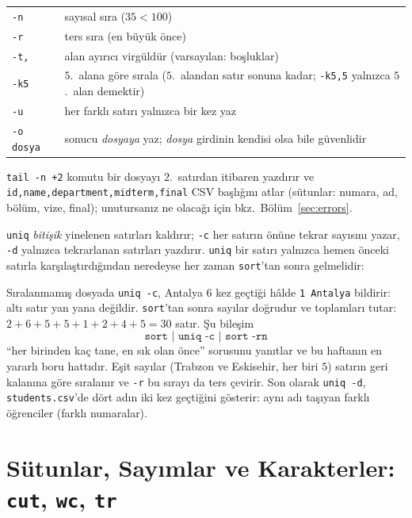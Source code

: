 \documentclass[11pt,a4paper]{article}
\newcommand{\cmd}[1]{\texttt{#1}}
\begin{document}
\begin{center}
\renewcommand{\arraystretch}{1.2}
\begin{tabular}{@{}lp{11.5cm}@{}}
\toprule
\cmd{-n} & sayısal sıra ($35 < 100$)\\
\cmd{-r} & ters sıra (en büyük önce)\\
\cmd{-t,} & alan ayırıcı virgüldür (varsayılan: boşluklar)\\
\cmd{-k5} & $5$.~alana göre sırala ($5$.~alandan satır sonuna kadar; \cmd{-k5,5} yalnızca $5$.~alan demektir)\\
\cmd{-u} & her farklı satırı yalnızca bir kez yaz\\
\cmd{-o dosya} & sonucu \emph{dosyaya} yaz; \emph{dosya} girdinin kendisi olsa bile güvenlidir\\
\bottomrule
\end{tabular}
\end{center}

\cmd{tail -n +2} komutu bir dosyayı $2$.~satırdan itibaren yazdırır ve \texttt{id,\allowbreak name,\allowbreak department,\allowbreak midterm,\allowbreak final} CSV başlığını atlar (sütunlar: numara, ad, bölüm, vize, final); unutursanız ne olacağı için bkz.\ Bölüm~\ref{sec:errors}.

\cmd{uniq} \emph{bitişik} yinelenen satırları kaldırır; \cmd{-c} her satırın önüne tekrar sayısını yazar, \cmd{-d} yalnızca tekrarlanan satırları yazdırır. \cmd{uniq} bir satırı yalnızca hemen önceki satırla karşılaştırdığından neredeyse her zaman \cmd{sort}'tan sonra gelmelidir:



Sıralanmamış dosyada \cmd{uniq -c}, Antalya $6$ kez geçtiği hâlde \texttt{1 Antalya} bildirir: altı satır yan yana değildir. \cmd{sort}'tan sonra sayılar doğrudur ve toplamları tutar: $2 + 6 + 5 + 5 + 1 + 2 + 4 + 5 = 30$ satır. Şu bileşim
\[
\texttt{sort | uniq -c | sort -rn}
\]
``her birinden kaç tane, en sık olan önce'' sorusunu yanıtlar ve bu haftanın en yararlı boru hattıdır. Eşit sayılar (Trabzon ve Eskisehir, her biri $5$) satırın geri kalanına göre sıralanır ve \cmd{-r} bu sırayı da ters çevirir. Son olarak \cmd{uniq -d}, \texttt{students.csv}'de dört adın iki kez geçtiğini gösterir: aynı adı taşıyan farklı öğrenciler (farklı numaralar).

\section{Sütunlar, Sayımlar ve Karakterler: \texttt{cut}, \texttt{wc}, \texttt{tr}}
\label{sec:cut}
\end{document}
